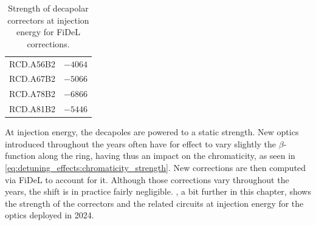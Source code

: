 \begin{table}
\begin{tabular}{lr}
        \hspace{2mm}RCD.A56B2 & $-4064$ \\
        \hspace{2mm}RCD.A67B2 & $-5066$ \\
        \hspace{2mm}RCD.A78B2 & $-6866$ \\
        \hspace{2mm}RCD.A81B2 & $-5446$ \\
        \bottomrule
    \end{tabular}
    \caption{Strength of decapolar correctors at injection energy for FiDeL corrections.}
    \label{tab:decapoles:strength_rcd_fidel}
\end{table}

At injection energy, the decapoles are powered to a static strength. New optics introduced
throughout the years often have for effect to vary slightly the $\beta$-function along the ring,
having thus an impact on the chromaticity, as seen in
\cref{eq:detuning_effects:chromaticity_strength}. New corrections are then computed via FiDeL to
account for it.
Although those corrections vary throughout the years, the shift is in practice fairly negligible.
, a bit further in this chapter, shows the strength of
the correctors and the related circuits at injection energy for the optics deployed in 2024.